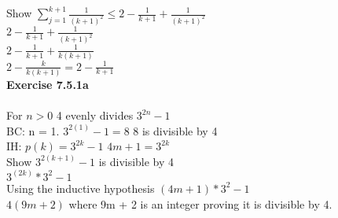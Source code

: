 \documentclass{article}
\begin{document}
Show $\sum_{j=1}^{k+1} \frac{1}{(k+1)^2} \leq 2 - \frac{1}{k+1} + \frac{1}{(k+1)^2}$\\
$2 - \frac{1}{k+1} + \frac{1}{(k+1)^2}$\\
$2 - \frac{1}{k+1} + \frac{1}{k(k+1)}$\\
$2 - \frac{k}{k(k+1)} = 2 - \frac{1}{k+1}$\\
\textbf{Exercise  7.5.1a}\\\\
For $n > 0$ 4 evenly divides $3^{2n}-1$\\
BC: n = 1. $3^{2(1)}-1 = 8$ 8 is divisible by 4\\
IH: $p(k) = 3^{2k}-1$ $4m + 1= 3^{2k}$\\
Show $3^{2(k+1)}-1$ is divisible by 4\\
$3^(2k) * 3^2 - 1$\\
Using the inductive hypothesis $(4m+1) * 3^2 - 1$\\
$4(9m + 2)$ where 9m + 2 is an integer proving it is divisible by 4.
\end{document}

